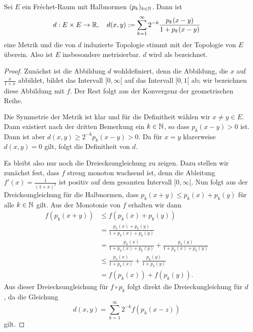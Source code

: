 \begin{prop}
  \label{prop:frechet-metrik}
  Sei $E$ ein Fr\'echet-Raum mit Halbnormen $(p_k)_{k \in \mathbb{N}}$. Dann
  ist
  \[
  d: E \times E \rightarrow \mathbb{R}, \quad d(x,y) := \sum_{k=1}^\infty 2^{-k}
  \frac{p_k(x-y)}{1 + p_k(x-y)}
  \]
  eine Metrik und die von $d$ induzierte Topologie stimmt mit der
  Topologie von $E$ überein. Also ist $E$ insbesondere
  metrisierbar. $d$ wird als  bezeichnet.
\end{prop}

\begin{proof}
  Zunächst ist die Abbildung $d$ wohldefiniert, denn die Abbildung,
  die $x$ auf $\frac{x}{1+x}$ abbildet, bildet das
  Intervall $[0, \infty[$ auf das Intervall $[0,1[$ ab; wir bezeichnen
  diese Abbildung mit $f$. Der Rest folgt
  aus der Konvergenz der geometrischen Reihe.

  Die Symmetrie der Metrik ist klar und für die Definitheit wählen wir
  $x\neq y \in E$. Dann existiert nach der dritten Bemerkung ein $k \in
  \mathbb{N}$, so dass $p_k(x-y) >0$ ist. Dann ist aber $d(x,y) \geq
  2^{-k}p_k(x-y) > 0$. Da für $x =y$ klarerweise $d(x,y) =0$ gilt,
  folgt die Definitheit von $d$.

  Es bleibt also nur noch die
  Dreiecksungleichung zu zeigen. Dazu stellen wir zunächst fest, dass
  $f$ streng monoton wachsend ist, denn die Ableitung $f'(x) =
  \frac{1}{(1+x)^2}$ ist positiv auf dem gesamten Intervall $[0,
  \infty[$. Nun folgt aus der Dreicksungleichung für die Halbnormen,
  dass $p_k(x+y) \leq p_k(x) + p_k(y)$ für alle $k \in \mathbb{N}$ gilt. Aus
  der Monotonie von $f$ erhalten wir dann
  \begin{align*}
    f(p_k(x+y)) & \leq f(p_k(x) + p_k(y)) \\
    & = \frac{ p_k(x) + p_k(y)}{1 + p_k(x) + p_k(y)}\\
    & = \frac{p_k(x)}{1+ p_k(x)+p_k(y)} + \frac{p_k(y)}{1+p_k(x) +
      p_k(y)} \\
    & \leq \frac{p_k(x)}{1+p_k(x)} + \frac{p_k(y)}{1+ p_k(y)} \\
    & = f(p_k(x)) + f(p_k(y)).
  \end{align*}
  Aus dieser Dreiecksungleichung für $f \circ p_k$ folgt direkt die
  Dreieckungleichung für $d$, da die Gleichung
  \[
  d(x,y) = \sum_{k=1}^\infty 2^{-k}f(p_k(x-z))
  \]
  gilt.
  

\end{proof}
